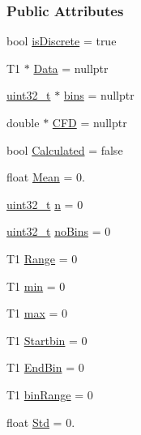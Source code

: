 \subsubsection*{Public Attributes}
\begin{DoxyCompactItemize}
\item 
bool \hyperlink{class_soil_math_1_1_stats_a2f54bbc8d815345b23ebbd4ba2b302bf}{is\+Discrete} = true
\item 
T1 $\ast$ \hyperlink{class_soil_math_1_1_stats_affce366ceab8419a3f732e3c3a358f65}{Data} = nullptr
\item 
\hyperlink{_soil_math_types_8h_a435d1572bf3f880d55459d9805097f62}{uint32\+\_\+t} $\ast$ \hyperlink{class_soil_math_1_1_stats_a00778b298b1ebb335eb0c4eed69e471c}{bins} = nullptr
\item 
double $\ast$ \hyperlink{class_soil_math_1_1_stats_a0d68c6fb52cb445c413aa187038bb1fe}{C\+F\+D} = nullptr
\item 
bool \hyperlink{class_soil_math_1_1_stats_a3d3cd491b829b2e30f6752fee38fe261}{Calculated} = false
\item 
float \hyperlink{class_soil_math_1_1_stats_a6f53982d52cf492ddd4df9b56bd014e7}{Mean} = 0.
\item 
\hyperlink{_soil_math_types_8h_a435d1572bf3f880d55459d9805097f62}{uint32\+\_\+t} \hyperlink{class_soil_math_1_1_stats_a7bc57af334b68253832ebac17f85d091}{n} = 0
\item 
\hyperlink{_soil_math_types_8h_a435d1572bf3f880d55459d9805097f62}{uint32\+\_\+t} \hyperlink{class_soil_math_1_1_stats_a4202c9085eacaff2e04eda84fc90e92b}{no\+Bins} = 0
\item 
T1 \hyperlink{class_soil_math_1_1_stats_a7154ac6c97dc2e83bdff7fef3cbdac5b}{Range} = 0
\item 
T1 \hyperlink{class_soil_math_1_1_stats_aa44c07a23b1c2ce0f0407e7cee4f39a9}{min} = 0
\item 
T1 \hyperlink{class_soil_math_1_1_stats_ad49ee1f533564ec587cf98a094b8c564}{max} = 0
\item 
T1 \hyperlink{class_soil_math_1_1_stats_acf54f4a105482109ebc884c8e56d0ba9}{Startbin} = 0
\item 
T1 \hyperlink{class_soil_math_1_1_stats_a0db07157ff238d0d40c4e1f4d67afd46}{End\+Bin} = 0
\item 
T1 \hyperlink{class_soil_math_1_1_stats_a00be1d2a705a8aba532fbe726001bbb2}{bin\+Range} = 0
\item 
float \hyperlink{class_soil_math_1_1_stats_a6af590b7d033d882d5428c0d7a1f5e59}{Std} = 0.
\item 

\end{DoxyCompactItemize}
